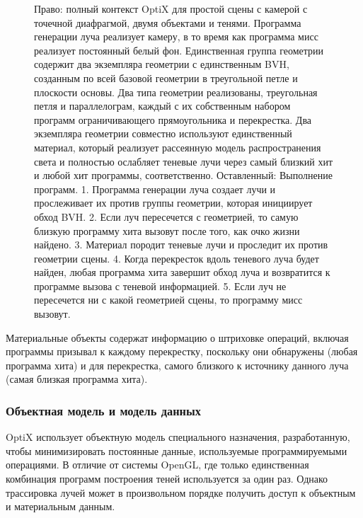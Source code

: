 \begin{figure}[h!]
\caption{Право: полный контекст OptiX для простой сцены с камерой с точечной диафрагмой, двумя объектами и тенями. Программа генерации луча реализует камеру, в то время как программа мисс реализует постоянный белый фон. Единственная группа геометрии содержит два экземпляра геометрии с единственным BVH, созданным по всей базовой геометрии в треугольной петле и плоскости основы. Два типа геометрии реализованы, треугольная петля и параллелограм, каждый с их собственным набором программ ограничивающего прямоугольника и перекрестка. Два экземпляра геометрии совместно используют единственный материал, который реализует рассеянную модель распространения света и полностью ослабляет теневые лучи через самый близкий хит и любой хит
программы, соответственно. Оставленный: Выполнение программ. 1. Программа генерации луча создает лучи и прослеживает их против группы геометрии, которая инициирует обход BVH. 2. Если луч пересечется с геометрией, то самую близкую программу хита вызовут после того, как очко жизни найдено.
3. Материал породит теневые лучи и проследит их против геометрии сцены. 4. Когда перекресток вдоль теневого луча будет найден, любая программа хита завершит обход луча и возвратится к программе вызова с теневой информацией. 5. Если луч не пересечется ни с какой геометрией сцены, то программу мисс вызовут.}
\label{fig1}
\end{figure}

Материальные объекты содержат информацию о штриховке операций, включая программы призывал к каждому перекрестку, поскольку они обнаружены (любая программа хита) и для перекрестка, самого близкого к источнику данного луча (самая близкая программа хита).

\subsubsection {Объектная модель и модель данных}
OptiX использует объектную модель специального назначения, разработанную, чтобы минимизировать постоянные данные, используемые программируемыми операциями. В отличие от системы OpenGL, где только единственная комбинация программ построения теней используется за один раз. Однако трассировка лучей может в произвольном порядке получить доступ к объектным и материальным данным. 

